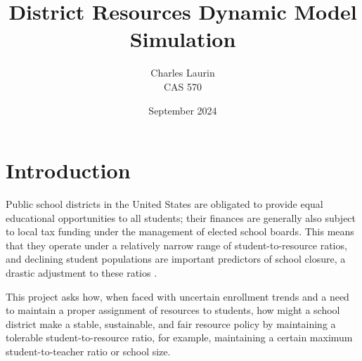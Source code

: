 \documentclass{article}
\title{District Resources Dynamic Model Simulation}
\author{Charles Laurin \\CAS 570}
\date{September 2024}
\begin{document}
\maketitle


\section*{Introduction}
Public school districts in the United States are obligated to provide equal educational opportunities to all students; their finances are generally also subject to local tax funding under the management of elected school boards. This means that they operate under a relatively narrow range of student-to-resource ratios, and declining student populations are important predictors of school closure, a drastic adjustment to these ratios \cite{harris2023extreme}. 

This project asks how, when faced with uncertain enrollment trends and a need to maintain a proper assignment of resources to students, how might a school district make a stable, sustainable, and fair resource policy by maintaining a tolerable student-to-resource ratio, for example, maintaining a certain maximum student-to-teacher ratio or school size.
\end{document}

